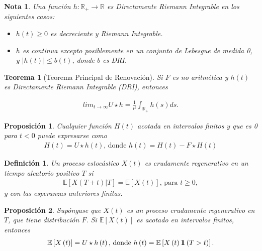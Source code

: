 \documentclass{article}
\newtheorem{Def}{Definición}[section]
\newtheorem{Teo}{Teorema}[section]
\newtheorem{Note}{Nota}[section]
\newtheorem{Prop}{Proposición}[section]
\newcommand{\rea}{\mathbb{R}}
\newcommand{\esp}{\mathbb{E}}
\newcommand{\indora}{\mbox{$1$\hspace{-0.8ex}$1$}}
\numberwithin{equation}{section}
\begin{document}
{\begin{Note} Una funci\'on $h:\rea_{+}\rightarrow\rea$ es Directamente Riemann Integrable en los siguientes casos:
\begin{itemize}
\item[a)] $h\left(t\right)\geq0$ es decreciente y Riemann Integrable.
\item[b)] $h$ es continua excepto posiblemente en un conjunto de Lebesgue de medida 0, y $|h\left(t\right)|\leq b\left(t\right)$, donde $b$ es DRI.
\end{itemize}
\end{Note}

\begin{Teo}[Teorema Principal de Renovaci\'on]
Si $F$ es no aritm\'etica y $h\left(t\right)$ es Directamente Riemann Integrable (DRI), entonces

\begin{eqnarray*}
lim_{t\rightarrow\infty}U\star h=\frac{1}{\mu}\int_{\rea_{+}}h\left(s\right)ds.
\end{eqnarray*}
\end{Teo}

\begin{Prop}
Cualquier funci\'on $H\left(t\right)$ acotada en intervalos finitos y que es 0 para $t<0$ puede expresarse como
\begin{eqnarray*}
H\left(t\right)=U\star h\left(t\right)\textrm{,  donde }h\left(t\right)=H\left(t\right)-F\star H\left(t\right)
\end{eqnarray*}
\end{Prop}

\begin{Def}
Un proceso estoc\'astico $X\left(t\right)$ es crudamente regenerativo en un tiempo aleatorio positivo $T$ si
\begin{eqnarray*}
\esp\left[X\left(T+t\right)|T\right]=\esp\left[X\left(t\right)\right]\textrm{, para }t\geq0,\end{eqnarray*}
y con las esperanzas anteriores finitas.
\end{Def}

\begin{Prop}
Sup\'ongase que $X\left(t\right)$ es un proceso crudamente regenerativo en $T$, que tiene distribuci\'on $F$. Si $\esp\left[X\left(t\right)\right]$ es acotado en intervalos finitos, entonces
\begin{eqnarray*}
\esp\left[X\left(t\right)\right]=U\star h\left(t\right)\textrm{,  donde }h\left(t\right)=\esp\left[X\left(t\right)\indora\left(T>t\right)\right].
\end{eqnarray*}
\end{Prop}

}
\end{document}

